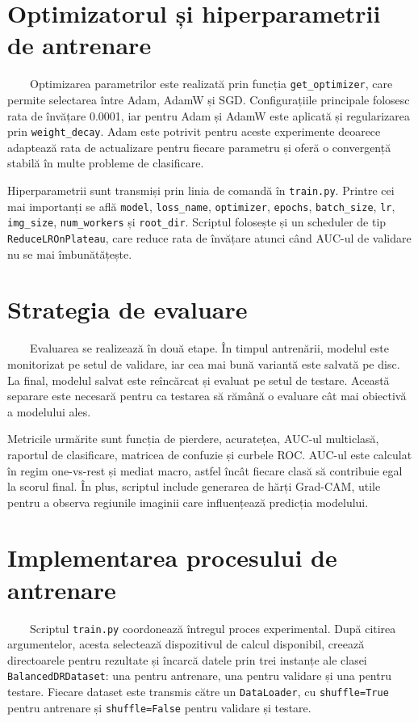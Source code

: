 \documentclass[12pt, a4paper, oneside, romanian]{teza-upb}
\begin{document}
\section{Optimizatorul și hiperparametrii de antrenare}

\ \ \ \ Optimizarea parametrilor este realizată prin funcția \texttt{get\_optimizer}, care permite selectarea între Adam, AdamW și SGD. Configurațiile principale folosesc rata de învățare 0.0001, iar pentru Adam și AdamW este aplicată și regularizarea prin \texttt{weight\_decay}. Adam este potrivit pentru aceste experimente deoarece adaptează rata de actualizare pentru fiecare parametru și oferă o convergență stabilă în multe probleme de clasificare.
\bigskip

Hiperparametrii sunt transmiși prin linia de comandă în \texttt{train.py}. Printre cei mai importanți se află \texttt{model}, \texttt{loss\_name}, \texttt{optimizer}, \texttt{epochs}, \texttt{batch\_size}, \texttt{lr}, \texttt{img\_size}, \texttt{num\_workers} și \texttt{root\_dir}. Scriptul folosește și un scheduler de tip \texttt{ReduceLROnPlateau}, care reduce rata de învățare atunci când AUC-ul de validare nu se mai îmbunătățește.

\section{Strategia de evaluare}

\ \ \ \ Evaluarea se realizează în două etape. În timpul antrenării, modelul este monitorizat pe setul de validare, iar cea mai bună variantă este salvată pe disc. La final, modelul salvat este reîncărcat și evaluat pe setul de testare. Această separare este necesară pentru ca testarea să rămână o evaluare cât mai obiectivă a modelului ales.
\bigskip

Metricile urmărite sunt funcția de pierdere, acuratețea, AUC-ul multiclasă, raportul de clasificare, matricea de confuzie și curbele ROC. AUC-ul este calculat în regim one-vs-rest și mediat macro, astfel încât fiecare clasă să contribuie egal la scorul final. În plus, scriptul include generarea de hărți Grad-CAM, utile pentru a observa regiunile imaginii care influențează predicția modelului.

\section{Implementarea procesului de antrenare}

\ \ \ \ Scriptul \texttt{train.py} coordonează întregul proces experimental. După citirea argumentelor, acesta selectează dispozitivul de calcul disponibil, creează directoarele pentru rezultate și încarcă datele prin trei instanțe ale clasei \texttt{BalancedDRDataset}: una pentru antrenare, una pentru validare și una pentru testare. Fiecare dataset este transmis către un \texttt{DataLoader}, cu \texttt{shuffle=True} pentru antrenare și \texttt{shuffle=False} pentru validare și testare.
\bigskip
\end{document}
